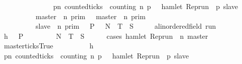 \begin{isabellebody}
\ \ \ \ \ \ \ \ \ \ \ \ \ \ {\isasymlongrightarrow}\ {\isacharparenleft}{\isasymforall}p{\isasymge}n{\isachardot}\ counted{\isacharunderscore}ticks\ {\isasymrho}\ counting\ n\ p\ {}\ {\isasymlongrightarrow}\ hamlet\ {\isacharparenleft}Rep{\isacharunderscore}run\ {\isasymrho}\ p\ slave{\isacharparenright}{\isacharparenright}{\isacharbraceright}\isanewline
\ \ \ \ \ \ \ \ {\isacharequal}\ {\isasymlbrakk}\ master\ {\isasymnot}{\isasymUp}\ n\ {\isasymrbrakk}\isactrlsub p\isactrlsub r\isactrlsub i\isactrlsub m\ {\isasymunion}\ {\isasymlbrakk}\ master\ {\isasymUp}\ n\ {\isasymrbrakk}\isactrlsub p\isactrlsub r\isactrlsub i\isactrlsub m\isanewline
\ \ \ \ \ \ \ \ {\isasyminter}\ {\isasymlbrakk}\ slave\ {\isasymUp}\ n\ {\isasymrbrakk}\isactrlsub p\isactrlsub r\isactrlsub i\isactrlsub m{\isacartoucheclose}\ {\isacharparenleft}\ {\isacartoucheopen}{\isacharbraceleft}{\isasymrho}{\isachardot}\ {\isacharquery}P\ {\isasymrho}{\isacharbraceright}\ {\isacharequal}\ {\isacharquery}N\ {\isasymunion}\ {\isacharquery}T\ {\isasyminter}\ {\isacharquery}S{\isacartoucheclose}{\isacharparenright}\isanewline
%
\isadelimproof
%
\endisadelimproof
%
\isatagproof
{}\isamarkupfalse%
\isanewline
\ \ \isacommand{{\isacharbraceleft}}\isamarkupfalse%
\ \isamarkupfalse%
\ {\isasymrho}{\isacharcolon}{\isacharcolon}{\isacartoucheopen}{\isacharparenleft}{\isacharprime}a{\isacharcolon}{\isacharcolon}linordered{\isacharunderscore}field{\isacharparenright}\ run{\isacartoucheclose}\isanewline
\ \ \ \ \isamarkupfalse%
\ h{\isacharcolon}{\isacartoucheopen}{\isasymrho}\ {\isasymin}\ {\isacharbraceleft}{\isasymrho}{\isachardot}\ {\isacharquery}P\ {\isasymrho}{\isacharbraceright}{\isacartoucheclose}\isanewline
\ \ \ \ \isamarkupfalse%
\ {\isacartoucheopen}{\isasymrho}\ {\isasymin}\ {\isacharquery}N\ {\isasymunion}\ {\isacharquery}T\ {\isasyminter}\ {\isacharquery}S{\isacartoucheclose}\isanewline
\ \ \ \ \isamarkupfalse%
\ {\isacharparenleft}cases\ {\isacartoucheopen}hamlet\ {\isacharparenleft}Rep{\isacharunderscore}run\ {\isasymrho}\ n\ master{\isacharparenright}{\isacartoucheclose}{\isacharparenright}\isanewline
\ \ \ \ \ \ \isamarkupfalse%
\ master{\isacharunderscore}ticks{\isacharcolon}True\isanewline
\ \ \ \ \ \ \ \ \isamarkupfalse%
\ h\ \isamarkupfalse%
\ {\isacartoucheopen}{\isacharparenleft}{\isasymforall}p{\isasymge}n{\isachardot}\ counted{\isacharunderscore}ticks\ {\isasymrho}\ counting\ n\ p\ {}\ {\isasymlongrightarrow}\ hamlet\ {\isacharparenleft}Rep{\isacharunderscore}run\ {\isasymrho}\ p\ slave{\isacharparenright}{\isacharparenright}{\isacartoucheclose}\ \isamarkupfalse%

\end{isabellebody}
